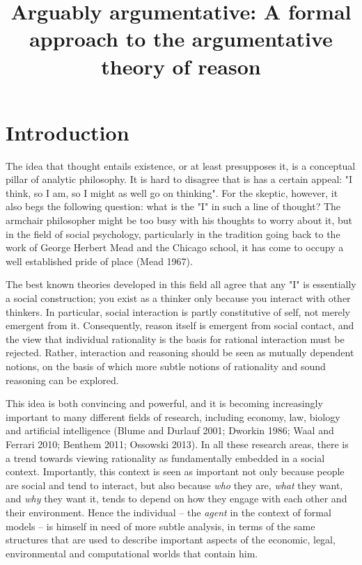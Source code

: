 \documentclass[greybox]{svmult}
\begin{document}
\title*{Arguably argumentative: A formal approach to the argumentative theory of reason}

\maketitle

\section{Introduction}\label{sec:intro}

The idea that thought entails existence, or at least presupposes it, is a conceptual pillar of analytic philosophy. It is hard to disagree that is has a certain appeal: "I think, so I am, so I might as well go on thinking". For the skeptic, however, it also begs the following question: what is the "I" in such a line of thought? The armchair philosopher might be too busy with his thoughts to worry about it, but in the field of social psychology, particularly in the tradition going back to the work of George Herbert Mead and the Chicago school, it has come to occupy a well established pride of place (Mead 1967).

The best known theories developed in this field all agree that any "I" is essentially a social construction; you exist as a thinker only because you interact with other thinkers. In particular, social interaction is partly constitutive of self, not merely emergent from it. Consequently, reason itself is emergent from social contact, and the view that individual rationality is the basis for rational interaction must be rejected. Rather, interaction and reasoning should be seen as mutually dependent notions, on the basis of which more subtle notions of rationality and sound reasoning can be explored.

This idea is both convincing and powerful, and it is becoming increasingly important to many different fields of research, including economy, law, biology and artificial intelligence (Blume and Durlauf 2001; Dworkin 1986; Waal and Ferrari 2010; Benthem 2011; Ossowski 2013). In all these research areas, there is a trend towards  viewing rationality as fundamentally embedded in a social context. Importantly, this context is seen as important not only because people are social and tend to interact, but also because \emph{who} they are, \emph{what} they want, and \emph{why} they want it, tends to depend on how they engage with each other and their environment. Hence the individual -- the \emph{agent} in the context of formal models -- is himself in need of more subtle analysis, in terms of the same structures that are used to describe important aspects of the economic, legal, environmental and computational worlds that contain him. 
\end{document}
